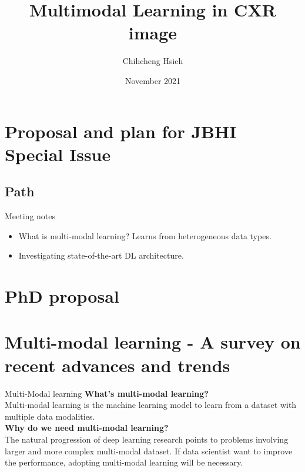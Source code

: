 \documentclass[aspectratio=169]{beamer}
\title{Multimodal Learning in CXR image}
\author{Chihcheng Hsieh}
\institute{Queensland University of Technology}
\date{November 2021}
\begin{document}
\maketitle

\section{Proposal and plan for JBHI Special Issue}
\subsection{Path}

\begin{frame}{Meeting notes}
    \begin{itemize}
        \item What is multi-modal learning? Learns from heterogeneous data
              types.
        \item Investigating state-of-the-art DL architecture.
    \end{itemize}
\end{frame}

\section{PhD proposal}
\begin{frame}{}
\end{frame}

\section{Multi-modal learning - A survey on recent advances and trends}

\begin{frame}{Multi-Modal learning}
    \Large\textbf{What's multi-modal learning?} \\
    Multi-modal learning is the machine learning model to learn from a dataset
    with multiple data modalities.\\
    \Large\textbf{Why do we need multi-modal learning?} \\
    The natural progression of deep learning research points to problems
    involving larger and more complex multi-modal dataset. If data scientist
    want
    to improve the performance, adopting multi-modal learning will be
    necessary.
\end{frame}
\end{document}
